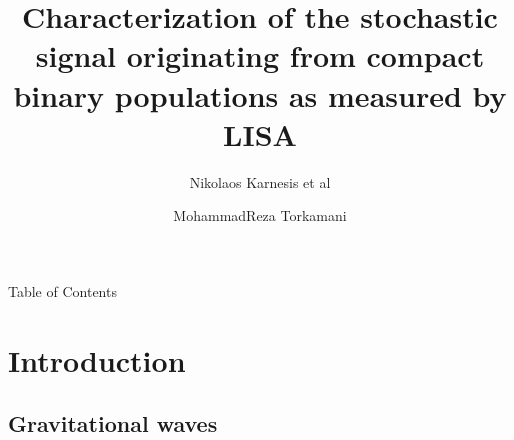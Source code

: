 \documentclass[pdf]{beamer}
\title[Stochastic signal originating from CGBs mesured by LISA]{Characterization of the stochastic signal originating from compact binary
populations as measured by LISA}
\subtitle{Nikolaos Karnesis et al}
\author{MohammadReza Torkamani}
\begin{document}

\begin{frame}
    \titlepage
\end{frame}

\begin{frame}{Table of Contents}
\vspace*{.1cm}
  \tableofcontents
\end{frame}
\section{Introduction}
\subsection{Gravitational waves}
\end{document}

